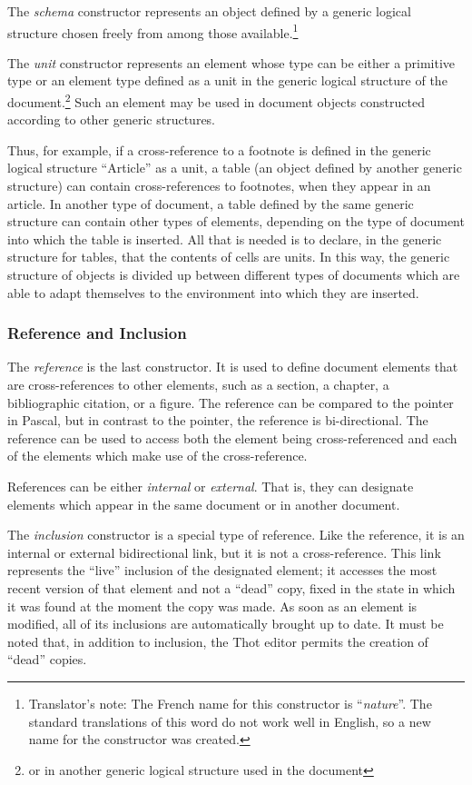 The {\em schema} constructor represents an object defined by a generic
logical structure chosen freely from among those
available.\footnote{Translator's note: The French name for this
constructor is ``{\em nature}''.  The standard translations of this
word do not work well in English, so a new name for the constructor
was created.}

The {\em unit} constructor represents an element whose type can be
either a primitive type or an element type defined as a unit in the generic
logical structure of the document.\footnote{or in another generic
logical structure used in the document} Such an element may be used in
document objects constructed according to other generic
structures.

Thus, for example, if a cross-reference to a footnote is defined in
the generic logical structure ``Article'' as a unit, a table (an
object defined by another generic structure) can contain
cross-references to footnotes, when they appear in an article.  In
another type of document, a table defined by the same generic structure
can contain other types of elements, depending on the type of document
into which the table is inserted.  All that is needed is to declare, in
the generic structure for tables, that the contents of cells are
units.  In this way, the generic structure of objects is divided up
between different types of documents which are able to adapt
themselves to the environment into which they are inserted.

\subsubsection{Reference and Inclusion}

The {\em reference} is the last constructor.  It is used to define
document elements that are cross-references to other elements, such as
a section, a chapter, a bibliographic citation, or a figure.  The
reference can be compared to the pointer in Pascal, but in contrast to
the pointer, the reference is bi-directional.  The reference can be
used to access both the element being cross-referenced and each of the
elements which make use of the cross-reference.

References can be either {\em internal} or {\em external}.  That is,
they can designate elements which appear in the same document or in
another document.

\label{inclusion}
The {\em inclusion} constructor is a special type of reference.  Like
the reference, it is an internal or external bidirectional link, but
it is not a cross-reference.  This link represents the ``live''
inclusion of the designated element; it accesses the most recent
version of that element and not a ``dead'' copy, fixed in the state
in which it was found at the moment the copy was made.  As soon as an
element is modified, all of its inclusions are automatically brought
up to date.  It must be noted that, in addition to inclusion, the Thot
editor permits the creation of ``dead'' copies.

